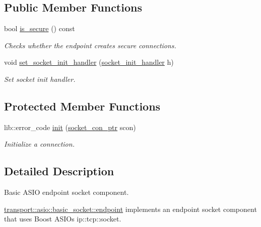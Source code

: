 \subsection*{Public Member Functions}
\begin{DoxyCompactItemize}
\item 
bool \mbox{\hyperlink{classwebsocketpp_1_1transport_1_1asio_1_1basic__socket_1_1endpoint_a6550df7b22b4833d8246325c0823afc3}{is\+\_\+secure}} () const
\begin{DoxyCompactList}\small\item\em Checks whether the endpoint creates secure connections. \end{DoxyCompactList}\item 
void \mbox{\hyperlink{classwebsocketpp_1_1transport_1_1asio_1_1basic__socket_1_1endpoint_a0b2b36f3a69b2a7d8f54858f4fbd09e7}{set\+\_\+socket\+\_\+init\+\_\+handler}} (\mbox{\hyperlink{namespacewebsocketpp_1_1transport_1_1asio_1_1basic__socket_a88f9c59fa40db3188769162db98edb93}{socket\+\_\+init\+\_\+handler}} h)
\begin{DoxyCompactList}\small\item\em Set socket init handler. \end{DoxyCompactList}\end{DoxyCompactItemize}
\subsection*{Protected Member Functions}
\begin{DoxyCompactItemize}
\item 
lib\+::error\+\_\+code \mbox{\hyperlink{classwebsocketpp_1_1transport_1_1asio_1_1basic__socket_1_1endpoint_a33e5c5a9086204933d3d2b3cacef4236}{init}} (\mbox{\hyperlink{classwebsocketpp_1_1transport_1_1asio_1_1basic__socket_1_1endpoint_afe9d86dd3fe9e8c73087f22daafcd70c}{socket\+\_\+con\+\_\+ptr}} scon)
\begin{DoxyCompactList}\small\item\em Initialize a connection. \end{DoxyCompactList}\end{DoxyCompactItemize}


\subsection{Detailed Description}
Basic A\+S\+IO endpoint socket component. 

\mbox{\hyperlink{classwebsocketpp_1_1transport_1_1asio_1_1basic__socket_1_1endpoint}{transport\+::asio\+::basic\+\_\+socket\+::endpoint}} implements an endpoint socket component that uses Boost A\+S\+IO\textquotesingle{}s ip\+::tcp\+::socket. 

